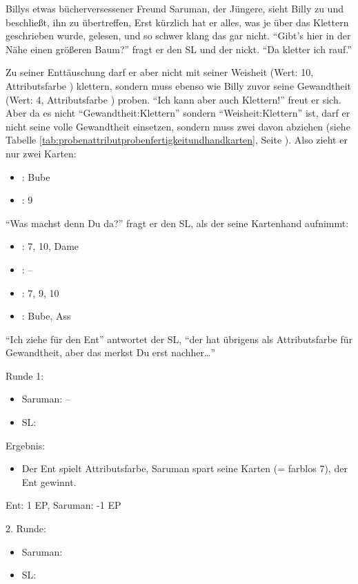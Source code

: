 Billys etwas bücherversessener Freund Saruman, der Jüngere, sieht Billy zu und beschließt, ihn zu übertreffen, Erst kürzlich hat er alles, was je über das Klettern geschrieben wurde, gelesen, und so schwer klang das gar nicht. "`Gibt's hier in der Nähe einen größeren Baum?"' fragt er den SL und der nickt. "`Da kletter ich rauf."'

Zu seiner Enttäuschung darf er aber nicht mit seiner Weisheit (Wert: 10, Attributsfarbe \karo) klettern, sondern muss ebenso wie Billy zuvor seine Gewandtheit (Wert: 4, Attributsfarbe \kreuz) proben. "`Ich kann aber auch Klettern!"' freut er sich. Aber da es nicht "`Gewandtheit:Klettern"' sondern "`Weisheit:Klettern"' ist, darf er nicht seine volle Gewandtheit einsetzen, sondern muss zwei davon abziehen (siehe Tabelle \ref {tab:probenattributprobenfertigkeitundhandkarten}, Seite \pageref {tab:probenattributprobenfertigkeitundhandkarten}). Also zieht er nur zwei Karten:
\begin {itemize}
\item \karo: Bube
\item \kreuz: 9
\end {itemize}

"`Was machst denn Du da?"' fragt er den SL, als der seine Kartenhand aufnimmt:
\begin {itemize}
\item \herz: 7, 10, Dame
\item \karo: --
\item \pik: 7, 9, 10
\item \kreuz: Bube, Ass
\end {itemize}

"`Ich ziehe für den Ent"' antwortet der SL, "`der hat übrigens \pik als Attributsfarbe für Gewandtheit, aber das merkst Du erst nachher\dots"'

Runde 1:
\begin {itemize}
\item Saruman: --
\item SL: 
\end {itemize}

Ergebnis: 
\begin {itemize}
\item Der Ent spielt Attributsfarbe, Saruman spart seine Karten (= farblos 7), der Ent gewinnt. 
\end {itemize}
Ent: 1 EP, Saruman: -1 EP

2. Runde:
\begin {itemize}
\item Saruman: 
\item SL: 
\end {itemize}

